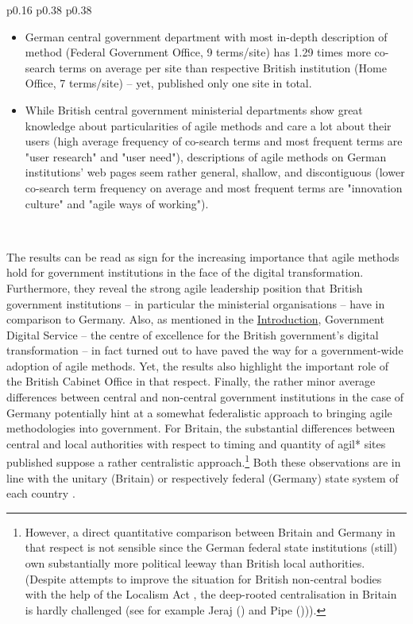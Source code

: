 \begin{spacing}{.9}
\begin{longtable}[ht!]{p{0.16\textwidth} p{0.38\textwidth} p{0.38\textwidth}}
{\begin{minipage}[t]{\linewidth}
\begin{itemize}[nosep, wide=0pt, leftmargin=*, after=\strut]
    \item German central government department with most in-depth description of method (Federal Government Office, 9 terms/site) has 1.29 times more co-search terms on average per site than respective British institution (Home Office, 7 terms/site) – yet, published only one site in total.
    \item While British central government ministerial departments show great knowledge about particularities of agile methods and care a lot about their users (high average frequency of co-search terms and most frequent terms are "user research" and "user need"), descriptions of agile methods on German institutions' web pages seem rather general, shallow, and discontiguous (lower co-search term frequency on average and most frequent terms are "innovation culture" and "agile ways of working").
    \end{itemize}
    \end{minipage}}\\
    \hline
\end{longtable}
\end{spacing}
\endgroup
\vspace{-0.1cm}


The results can be read as sign for the increasing importance that agile methods hold for government institutions in the face of the digital transformation. Furthermore, they reveal the strong agile leadership position that British government institutions – in particular the ministerial organisations – have in comparison to Germany. Also, as mentioned in the \hyperref[Introduction]{Introduction}, Government Digital Service – the centre of excellence for the British government's digital transformation – in fact turned out to have paved the way for a government-wide adoption of agile methods. Yet, the results also highlight the important role of the British Cabinet Office in that respect. Finally, the rather minor average differences between central and non-central government institutions in the case of Germany potentially hint at a somewhat federalistic approach to bringing agile methodologies into government. For Britain, the substantial differences between central and local authorities with respect to timing and quantity of agil* sites published suppose a rather centralistic approach.\footnote{However, a direct quantitative comparison between Britain and Germany in that respect is not sensible since the German federal state institutions (still) own substantially more political leeway than British local authorities. (Despite attempts to improve the situation for British non-central bodies with the help of the Localism Act \parencite{Legislation.gov.uk2011}, the deep-rooted centralisation in Britain is hardly challenged (see for example Jeraj (\cite*{Jeraj2013}) and Pipe (\cite*{ Pipe2013}))).} Both these observations are in line with the unitary (Britain) or respectively federal (Germany) state system of each country \parencite{Elazar1997}. 


